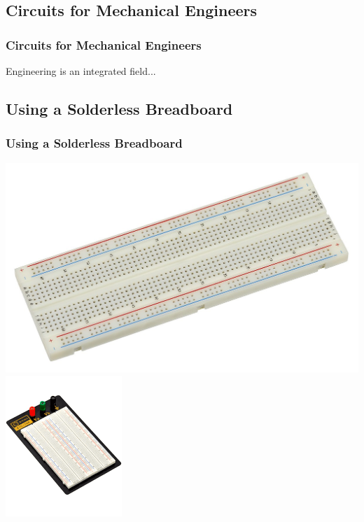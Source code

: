 \documentclass[fleqn]{beamer} %
\newcommand{\sectionIIsubsectionItitle}{Circuits for Mechanical Engineers}
\newcommand{\sectionIIsubsectionIItitle}{Using a Solderless Breadboard}
\begin{document}
		\subsection{\sectionIIsubsectionItitle}\label{sectionIIsubsectionI}

			\begin{frame}[label=sectionIIsubsectionI]
				\frametitle{\sectionIIsubsectionItitle}

				Engineering is an integrated field...

			\end{frame}

		\subsection{\sectionIIsubsectionIItitle}\label{sectionIIsubsectionII}

			\begin{frame}
				\frametitle{\sectionIIsubsectionIItitle}

				\includegraphics[scale=.125]{images/breadboard_large.jpg} 	
				\includegraphics[scale=.65]{images/breadboard_wplugs.png} 
		

			\end{frame}
\end{document}
